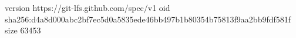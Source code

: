 version https://git-lfs.github.com/spec/v1
oid sha256:d4a8d000abc2bf7ec5d0a5835ede46bb497b1b80354b75813f9aa2bb9fdf581f
size 63453
